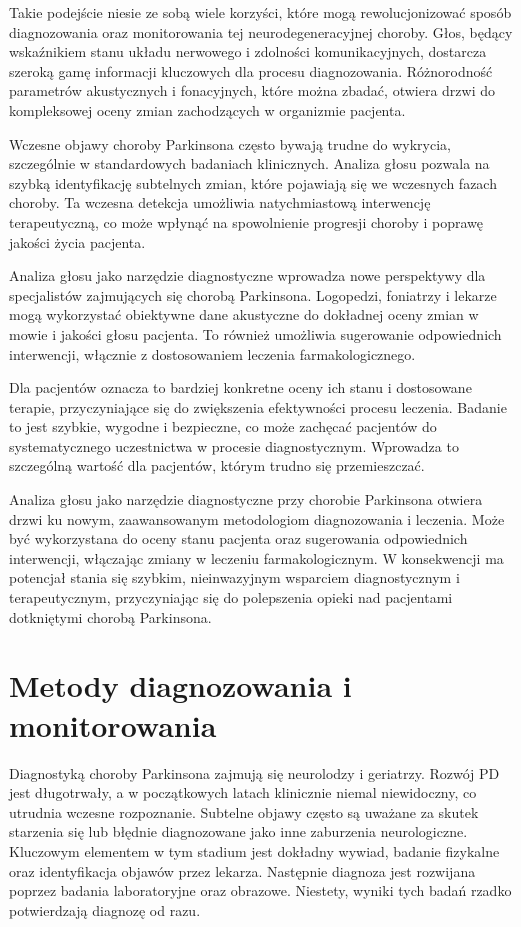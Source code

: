 Takie podejście niesie ze sobą wiele korzyści, które mogą rewolucjonizować sposób diagnozowania oraz monitorowania tej neurodegeneracyjnej choroby.
Głos, będący wskaźnikiem stanu układu nerwowego i zdolności komunikacyjnych, dostarcza szeroką gamę informacji kluczowych dla procesu diagnozowania.
Różnorodność parametrów akustycznych i fonacyjnych, które można zbadać, otwiera drzwi do kompleksowej oceny zmian zachodzących w organizmie pacjenta.

Wczesne objawy choroby Parkinsona często bywają trudne do wykrycia, szczególnie w standardowych badaniach klinicznych.
Analiza głosu pozwala na szybką identyfikację subtelnych zmian, które pojawiają się we wczesnych fazach choroby.
Ta wczesna detekcja umożliwia natychmiastową interwencję terapeutyczną, co może wpłynąć na spowolnienie progresji choroby i poprawę jakości życia pacjenta.

Analiza głosu jako narzędzie diagnostyczne wprowadza nowe perspektywy dla specjalistów zajmujących się chorobą Parkinsona.
Logopedzi, foniatrzy i lekarze mogą wykorzystać obiektywne dane akustyczne do dokładnej oceny zmian w mowie i jakości głosu pacjenta.
To również umożliwia sugerowanie odpowiednich interwencji, włącznie z dostosowaniem leczenia farmakologicznego.

Dla pacjentów oznacza to bardziej konkretne oceny ich stanu i dostosowane terapie, przyczyniające się do zwiększenia efektywności procesu leczenia.
Badanie to jest szybkie, wygodne i bezpieczne, co może zachęcać pacjentów do systematycznego uczestnictwa w procesie diagnostycznym.
Wprowadza to szczególną wartość dla pacjentów, którym trudno się przemieszczać.

Analiza głosu jako narzędzie diagnostyczne przy chorobie Parkinsona otwiera drzwi ku nowym, zaawansowanym metodologiom diagnozowania i leczenia.
Może być wykorzystana do oceny stanu pacjenta oraz sugerowania odpowiednich interwencji, włączając zmiany w leczeniu farmakologicznym.
W konsekwencji ma potencjał stania się szybkim, nieinwazyjnym wsparciem diagnostycznym i terapeutycznym, przyczyniając się do polepszenia
opieki nad pacjentami dotkniętymi chorobą Parkinsona.

\section{Metody diagnozowania i monitorowania}
\label{subsec:diagnostyka}

Diagnostyką choroby Parkinsona zajmują się neurolodzy i geriatrzy.
Rozwój PD jest długotrwały, a w początkowych latach klinicznie niemal niewidoczny, co utrudnia wczesne rozpoznanie.
Subtelne objawy często są uważane za skutek starzenia się lub błędnie diagnozowane jako inne zaburzenia neurologiczne.
Kluczowym elementem w tym stadium jest dokładny wywiad, badanie fizykalne oraz identyfikacja objawów przez lekarza.
Następnie diagnoza jest rozwijana poprzez badania laboratoryjne  oraz obrazowe.
Niestety, wyniki tych badań rzadko potwierdzają diagnozę od razu.

